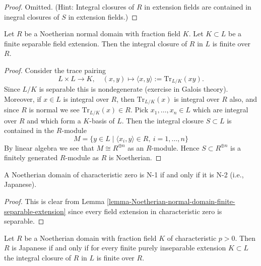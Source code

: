 \begin{proof}
Omitted. (Hint: Integral closures of $R$ in extension fields
are contained in inegral closures of $S$ in extension fields.)
\end{proof}

\begin{lemma}
\label{lemma-Noetherian-normal-domain-finite-separable-extension}
Let $R$ be a Noetherian normal domain with fraction field $K$.
Let $K \subset L$ be a finite separable field extension.
Then the integral closure of $R$ in $L$ is finite over $R$.
\end{lemma}

\begin{proof}
Consider the trace pairing
$$
L \times L \longrightarrow K,
\quad (x, y) \longmapsto \langle x, y\rangle := \text{Tr}_{L/K}(xy).
$$
Since $L/K$ is separable this is nondegenerate (exercise in Galois theory).
Moreover, if $x \in L$ is integral over $R$, then
$\text{Tr}_{L/K}(x)$ is integral over $R$ also, and since $R$ is
normal we see $\text{Tr}_{L/K}(x) \in R$.
Pick $x_1, \ldots, x_n \in L$ which are integral over $R$
and which form a $K$-basis of $L$. Then the integral closure
$S \subset L$ is contained in the $R$-module
$$
M = \{y \in L \mid \langle x_i, y\rangle \in R,\ i = 1, \ldots, n\}
$$
By linear algebra we see that $M \cong R^{\oplus n}$ as an $R$-module.
Hence $S \subset R^{\oplus n}$ is a finitely generated $R$-module
as $R$ is Noetherian.
\end{proof}

\begin{lemma}
\label{lemma-domain-char-zero-N-1-2}
A Noetherian domain of characteristic zero is N-1 if and only if
it is N-2 (i.e., Japanese).
\end{lemma}

\begin{proof}
This is clear from
Lemma \ref{lemma-Noetherian-normal-domain-finite-separable-extension}
since every field extension in characteristic zero is separable.
\end{proof}

\begin{lemma}
\label{lemma-domain-char-p-N-1-2}
Let $R$ be a Noetherian domain with fraction field $K$ of
characteristic $p > 0$. Then $R$ is Japanese if and only if
for every finite purely inseparable extension $K \subset L$ the integral
closure of $R$ in $L$ is finite over $R$.
\end{lemma}

